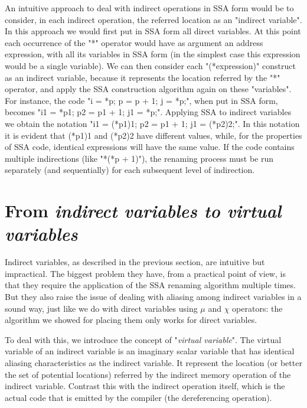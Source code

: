 An intuitive approach to deal with indirect operations in SSA form would be to consider, in each indirect operation, the referred location as an "indirect variable".
In this approach we would first put in SSA form all direct variables. At this point each occurrence of the "*" operator would have as argument an address expression, with all its variables in SSA form (in the simplest case this expression would be a single variable). We can then consider each "(*expression)" construct as an indirect variable, because it represents the location referred by the "*" operator, and apply the SSA construction algorithm again on these "variables".
For instance, the code "i = *p; p = p + 1; j = *p;", when put in SSA form, becomes "i1 = *p1; p2 = p1 + 1; j1 = *p;".
Applying SSA to indirect variables we obtain the notation "i1 = (*p1)1; p2 = p1 + 1; j1 = (*p2)2;". In this notation it is evident that (*p1)1 and (*p2)2 have different values, while, for the properties of SSA code, identical expressions will have the same value.
If the code contains multiple indirections (like "*(*p + 1)"), the renaming process must be run separately (and sequentially) for each subsequent level of indirection.


\section{From \em{indirect} variables to \em{virtual} variables}

Indirect variables, as described in the previous section, are intuitive but impractical.
The biggest problem they have, from a practical point of view, is that they require the application of the SSA renaming algorithm multiple times.
But they also raise the issue of dealing with aliasing among indirect variables in a sound way, just like we do with direct variables using $\mu$ and $\chi$ operators: the algorithm we showed for placing them only works for direct variables.

To deal with this, we introduce the concept of "{\em virtual variable}".
The virtual variable of an indirect variable is an imaginary scalar variable that has identical aliasing characteristics as the indirect variable.
It represent the location (or better the set of potential locations) referred by the indirect memory operation of the indirect variable.
Contrast this with the indirect operation itself, which is the actual code that is emitted by the compiler (the dereferencing operation).

